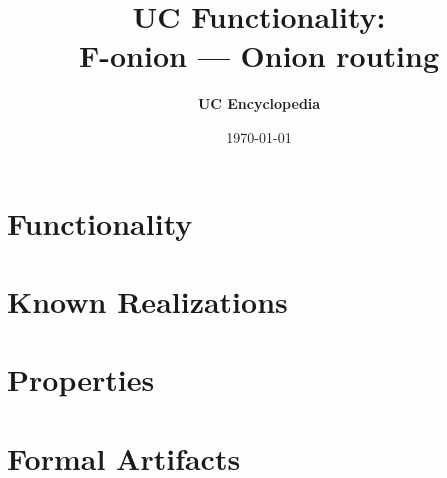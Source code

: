 \documentclass[11pt,a4paper]{article}
\title{\textbf{\Large UC Functionality:}\\[0.2em] \Large F-onion --- Onion routing}
\author{\textbf{UC Encyclopedia}}
\date{\today}
\newtheorem{functionality}{Functionality}
\begin{document}
\maketitle

\begin{abstract}
\end{abstract}

\section{Functionality}

%

\section{Known Realizations}


\section{Properties}


\section{Formal Artifacts}

\end{document}
